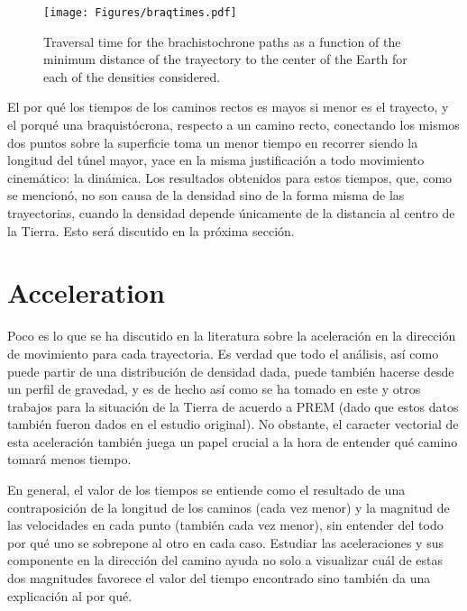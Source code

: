 \documentclass[aps,twocolumn,showpacs,preprintnumbers]{revtex4}
\begin{document}
            
            \begin{figure}
                \centering
                \texttt{[image: Figures/braqtimes.pdf]}
                \caption{Traversal time for the brachistochrone paths as a function of the minimum distance of the trayectory to the center of the Earth for each of the densities considered.}
                \label{fig:braquistochrone times}
            \end{figure}
            
            
        El por qué los tiempos de los caminos rectos es mayos si menor es el trayecto, y el porqué una braquistócrona, respecto a un camino recto, conectando los mismos dos puntos sobre la superficie toma un menor tiempo en recorrer siendo la longitud del túnel mayor, yace en la misma justificación a todo movimiento cinemático: la dinámica. Los resultados obtenidos para estos tiempos, que, como se mencionó, no son causa de la densidad sino de la forma misma de las trayectorias, cuando la densidad depende únicamente de la distancia al centro de la Tierra. Esto será discutido en la próxima sección.
        
\section{Acceleration}  \label{acceleration section}
    
        Poco es lo que se ha discutido en la literatura sobre la aceleración en la dirección de movimiento para cada trayectoria.
        Es verdad que todo el análisis, así como puede partir de una distribución de densidad dada, puede también hacerse desde un perfil de gravedad, y es de hecho así como se ha tomado en este y otros trabajos para la situación de la Tierra de acuerdo a PREM (dado que estos datos también fueron dados en el estudio original\cite{PREM}). No obstante, el caracter vectorial de esta aceleración también juega un papel crucial a la hora de entender qué camino tomará menos tiempo.
    
        En general, el valor de los tiempos se entiende como el resultado de una contraposición de la longitud de los caminos (cada vez menor) y la magnitud de las velocidades en cada punto (también cada vez menor), sin entender del todo por qué uno se sobrepone al otro en cada caso. Estudiar las aceleraciones y sus componente en la dirección del camino ayuda no solo a visualizar cuál de estas dos magnitudes favorece el valor del tiempo encontrado sino también da una explicación al por qué. 
   
\end{document}
